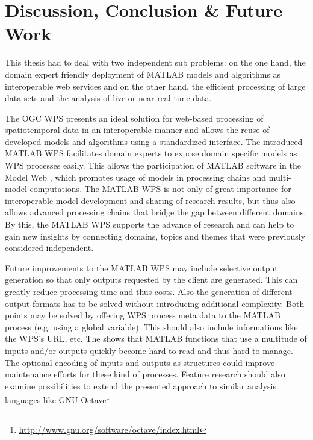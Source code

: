 
\chapter{Discussion, Conclusion \& Future Work}
\label{sec:conclusion}

This thesis had to deal with two independent sub problems: on the one hand, the domain expert friendly deployment of MATLAB models and algorithms as interoperable web services and on the other hand, the efficient processing of large data sets and the analysis of live or near real-time data.

The \ac{OGC} \acl{WPS} presents an ideal solution for web-based processing of spatiotemporal data in an interoperable manner and allows the reuse of developed models and algorithms using a standardized interface. The introduced MATLAB WPS facilitates domain experts to expose domain specific models as WPS processes easily. This allows the participation of MATLAB software in the Model Web \citep{geller2008looking}, which promotes usage of models in processing chains and multi-model computations. The MATLAB WPS is not only of great importance for interoperable model development and sharing of research results, but thus also allows advanced processing chains that bridge the gap between different domains. By this, the MATLAB WPS supports the advance of research and can help to gain new insights by connecting domains, topics and themes that were previously considered independent.

Future improvements to the MATLAB WPS may include selective output generation so that only outputs requested by the client are generated. This can greatly reduce processing time and thus costs. Also the generation of different output formats has to be solved without introducing additional complexity. Both points may be solved by offering WPS process meta data to the MATLAB process (e.g. using a global variable). This should also include informations like the WPS's URL, etc. The \la shows that MATLAB functions that use a multitude of inputs and/or outputs quickly become hard to read and thus hard to manage. The optional encoding of inputs and outputs as structures could improve maintenance efforts for these kind of processes. Feature research should also examine possibilities to extend the presented approach to similar analysis languages like GNU Octave\footnote{\url{http://www.gnu.org/software/octave/index.html} \lastretrievedp}.

